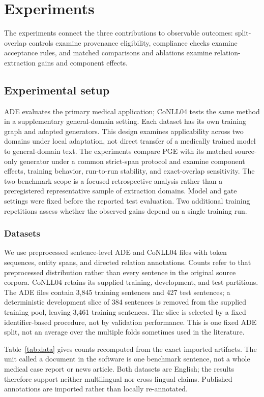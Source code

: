 \documentclass[a4paper,fleqn,numbers,doubleblind]{cas-dc}
\begin{document}
\section{Experiments}
\label{sec:experiment}
The experiments connect the three contributions to observable outcomes:
split-overlap controls examine provenance eligibility, compliance checks
examine acceptance rules, and matched comparisons and ablations examine
relation-extraction gains and component effects.

\subsection{Experimental setup}
ADE evaluates the primary medical application; CoNLL04 tests the same method
in a supplementary general-domain setting. Each dataset has its own training
graph and adapted generators. This design examines applicability across two
domains under local adaptation, not direct transfer of a medically trained
model to general-domain text.
The experiments compare PGE with its matched source-only generator under a
common strict-span protocol and examine component effects, training behavior,
run-to-run stability, and exact-overlap sensitivity. The two-benchmark scope is
a focused retrospective analysis rather than a preregistered representative
sample of extraction domains. Model and gate settings were fixed before the
reported test evaluation. Two additional training repetitions assess whether
the observed gains depend on a single training run.

\subsubsection{Datasets}
\label{sec:data}
We use preprocessed sentence-level ADE and CoNLL04 files with token sequences,
entity spans, and directed relation annotations.
Counts refer to that preprocessed distribution rather than every sentence in
the original source corpora. CoNLL04 retains its supplied training,
development, and test partitions. The ADE files contain 3,845 training
sentences and 427 test sentences; a deterministic development slice of 384
sentences is removed from the supplied training pool, leaving 3,461 training
sentences. The slice is selected by a fixed identifier-based procedure, not by
validation performance. This is one fixed ADE split, not an average over the
multiple folds sometimes used in the literature.

Table~\ref{tab:data} gives counts recomputed from the exact imported artifacts.
The unit called a document in the software is one benchmark sentence, not a
whole medical case report or news article. Both datasets are English; the
results therefore support neither multilingual nor cross-lingual claims.
Published annotations are imported rather than locally re-annotated.
\end{document}
